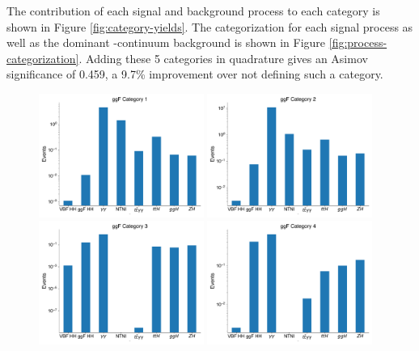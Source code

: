 The contribution of each signal and background process to each category is shown in Figure \ref{fig:category-yields}. The categorization for each signal process as well as the dominant \yy-continuum background is shown in Figure \ref{fig:process-categorization}. Adding these 5 categories in quadrature gives an Asimov significance of 0.459, a 9.7\% improvement over not defining such a category.

\begin{figure}[p!]
  \centering
  \includegraphics[width=0.48\textwidth]{chapters/chapter6_vbf/images/category_breakdown/ggfcat1.pdf}
  \includegraphics[width=0.48\textwidth]{chapters/chapter6_vbf/images/category_breakdown/ggfcat2.pdf}
  \includegraphics[width=0.48\textwidth]{chapters/chapter6_vbf/images/category_breakdown/ggfcat3.pdf}
  \includegraphics[width=0.48\textwidth]{chapters/chapter6_vbf/images/category_breakdown/ggfcat4.pdf}

\end{figure}
